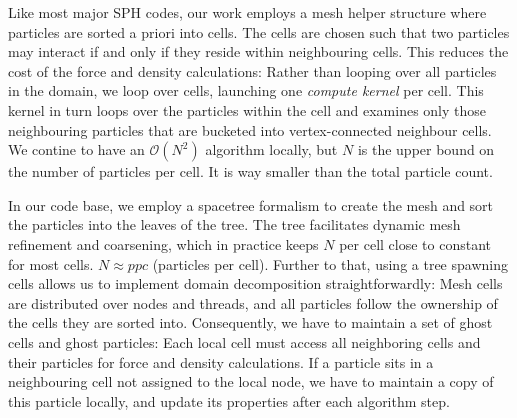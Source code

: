 
\noindent
{}



Like most major SPH codes, our work employs a mesh helper structure where particles are sorted a priori into cells.
The cells are chosen such that two particles may interact if and only if they reside within neighbouring cells.
This reduces the cost of the force and density calculations:
Rather than looping over all particles in the domain, we loop over cells, launching one \emph{compute kernel} per cell.
This kernel in turn loops over the particles within the cell and examines only those neighbouring particles that are bucketed into vertex-connected neighbour cells.
We contine to have an $\mathcal{O}(N^2)$ algorithm locally, but $N$ is the upper bound on the number of particles per cell.
It is way smaller than the total particle count.


In our code base, we employ a spacetree formalism \cite{Weinzierl:2015:pidt} to create the mesh and sort the particles into the leaves of the tree.
The tree facilitates dynamic mesh refinement and coarsening, which in practice keeps $N$ per cell close to constant for most cells.
$N \approx ppc$ (particles per cell).
Further to that, using a tree spawning cells allows us to implement domain decomposition straightforwardly:
Mesh cells are distributed over nodes and threads, and all particles follow the ownership of the cells they are sorted into.
Consequently, we have to maintain a set of ghost cells and ghost particles:
Each local cell must access all neighboring cells and their particles for force and density calculations.
If a particle sits in a neighbouring cell not assigned to the local node, we have to maintain a copy of this particle locally, and update its properties after each algorithm step.


